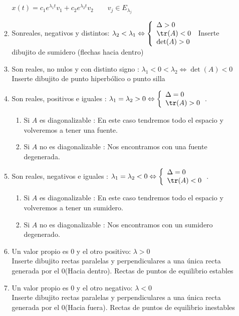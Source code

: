 \begin{itemize}
\begin{enumerate}
$x(t)=c_1 e^{\lambda_1t}v_1+c_2 e^{\lambda_2t}v_2 \qquad v_j \in E_{\lambda_j}$
\item Sonreales, negativos y distintos: $\lambda_2 < \lambda_1 \Leftrightarrow \left\{ \begin{array}{ll}\Delta > 0 \\ \tr(A) < 0 \\ \det(A)>0\end{array}\right.$
Inserte dibujito de sumidero (flechas hacia dentro)
\item Son reales, no nulos y con distinto signo : $\lambda_1 < 0 < \lambda_2 \Leftrightarrow \det(A)<0$
Inserte dibujito de punto hiperbólico o punto silla
\item Son reales, positivos e iguales : $\lambda_1=\lambda_2>0 \Leftrightarrow \left\{ \begin{array}{ll} \Delta = 0 \\ \tr(A)>0\end{array}\right.$.
\begin{enumerate}
\item Si $A$ es diagonalizable : En este caso tendremos todo el espacio y volveremos a tener una fuente.
\item Si $A$ no es diagonalizable : Nos encontramos con una fuente degenerada.
\end{enumerate}
\item Son reales, negativos e iguales : $\lambda_1=\lambda_2<0 \Leftrightarrow \left\{ \begin{array}{ll} \Delta = 0 \\ \tr(A)<0\end{array}\right.$.
\begin{enumerate}
\item Si $A$ es diagonalizable : En este caso tendremos todo el espacio y volveremos a tener un sumidero.
\item Si $A$ no es diagonalizable : Nos encontramos con un sumidero degenerado.
\end{enumerate}
\item Un valor propio es 0 y el otro positivo: $\lambda>0$ \\
Inserte dibujito rectas paralelas y perpendiculares a una única recta generada por el 0(Hacia dentro). Rectas  de puntos de equilibrio estables
\item Un valor propio es 0 y el otro negativo: $\lambda<0 $ \\
Inserte dibujito rectas paralelas y perpendiculares a una única recta generada por el 0(Hacia fuera). Rectas  de puntos de equilibrio inestables

\end{enumerate}
\end{itemize}
